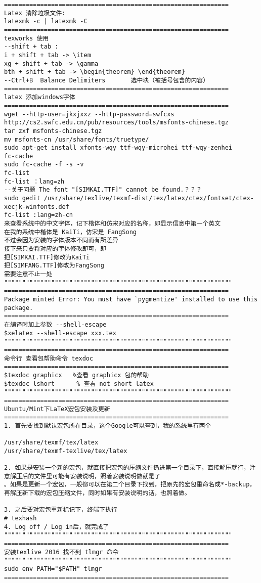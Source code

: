 \begin{verbatim}
============================================================== 
Latex 清除垃圾文件: 
latexmk -c | latexmk -C
==============================================================
texworks 使用
--shift + tab : 
i + shift + tab -> \item
xg + shift + tab -> \gamma
bth + shift + tab -> \begin{theorem} \end{theorem}
--Ctrl+B  Balance Delimiters       选中块（被括号包含的内容）
============================================================== 
latex 添加windows字体
============================================================== 
wget --http-user=jkxjxxz --http-password=swfcxs http://cs2.swfc.edu.cn/pub/resources/tools/msfonts-chinese.tgz
tar zxf msfonts-chinese.tgz
mv msfonts-cn /usr/share/fonts/truetype/
sudo apt-get install xfonts-wqy ttf-wqy-microhei ttf-wqy-zenhei
fc-cache
sudo fc-cache -f -s -v
fc-list
fc-list ：lang=zh
--关于问题 The font "[SIMKAI.TTF]" cannot be found.？？？
sudo gedit /usr/share/texlive/texmf-dist/tex/latex/ctex/fontset/ctex-xecjk-winfonts.def
fc-list :lang=zh-cn
来查看系统中的中文字体，记下楷体和仿宋对应的名称，即显示信息中第一个英文
在我的系统中楷体是 KaiTi，仿宋是 FangSong
不过会因为安装的字体版本不同而有所差异
接下来只要将对应的字体修改即可，即
把[SIMKAI.TTF]修改为KaiTi
把[SIMFANG.TTF]修改为FangSong
需要注意不止一处
""""""""""""""""""""""""""""""""""""""""""""""""""""""""""""""" 
============================================================== 
Package minted Error: You must have `pygmentize' installed to use this package. 
============================================================== 
在编译时加上参数 --shell-escape
$xelatex --shell-escape xxx.tex
""""""""""""""""""""""""""""""""""""""""""""""""""""""""""""""" 
============================================================== 
命令行 查看包帮助命令 texdoc
============================================================== 
$texdoc graphicx   %查看 graphicx 包的帮助
$texdoc lshort      % 查看 not short latex
""""""""""""""""""""""""""""""""""""""""""""""""""""""""""""""" 
============================================================== 
Ubuntu/Mint下LaTeX宏包安装及更新
============================================================== 
1. 首先要找到默认宏包所在目录，这个Google可以查到，我的系统里有两个

/usr/share/texmf/tex/latex 
/usr/share/texmf-texlive/tex/latex 

2. 如果是安装一个新的宏包，就直接把宏包的压缩文件扔进第一个目录下，直接解压就行，注意解压后的文件里可能有安装说明，照着安装说明做就是了
。如果是更新一个宏包，一般都可以在第二个目录下找到，把原先的宏包重命名成*-backup，再解压新下载的宏包压缩文件，同时如果有安装说明的话，也照着做。 

3. 之后要对宏包重新标记下，终端下执行
# texhash 
4. Log off / Log in后，就完成了
""""""""""""""""""""""""""""""""""""""""""""""""""""""""""""""" 
============================================================== 
安装texlive 2016 找不到 tlmgr 命令
""""""""""""""""""""""""""""""""""""""""""""""""""""""""""""""" 
sudo env PATH="$PATH" tlmgr
============================================================== 
\end{verbatim}